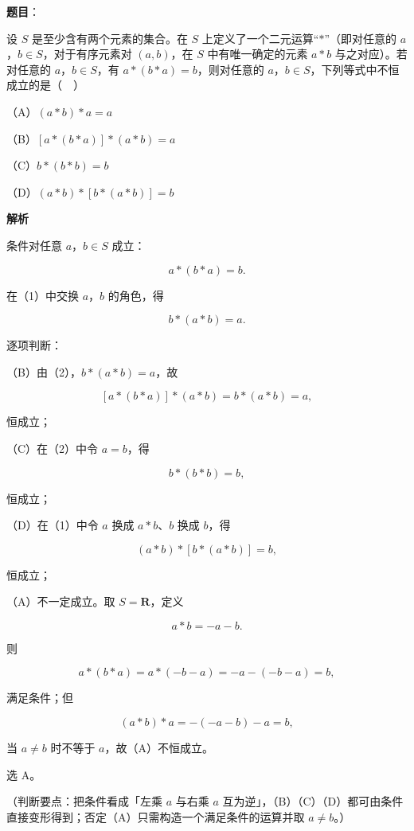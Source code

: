 \begin{answer}

\textbf{题目}：

设 $S$ 是至少含有两个元素的集合。在 $S$ 上定义了一个二元运算“$*$”（即对任意的 $a$，$b\in S$，对于有序元素对 $(a,b)$，在 $S$ 中有唯一确定的元素 $a*b$ 与之对应）。若对任意的 $a$，$b\in S$，有 $a*(b*a)=b$，则对任意的 $a$，$b\in S$，下列等式中不恒成立的是（　）

（A）$(a*b)*a=a$

（B）$[a*(b*a)]*(a*b)=a$

（C）$b*(b*b)=b$

（D）$(a*b)*[b*(a*b)]=b$

\textbf{解析}

条件对任意 $a$，$b\in S$ 成立：

\nopagebreak[4]
\[a*(b*a)=b.\tag{1}\]

在（1）中交换 $a$，$b$ 的角色，得

\nopagebreak[4]
\[b*(a*b)=a.\tag{2}\]

逐项判断：

（B）由（2），$b*(a*b)=a$，故

\nopagebreak[4]
\[[a*(b*a)]*(a*b)=b*(a*b)=a,\]

恒成立；

（C）在（2）中令 $a=b$，得

\nopagebreak[4]
\[b*(b*b)=b,\]

恒成立；

（D）在（1）中令 $a$ 换成 $a*b$、$b$ 换成 $b$，得

\nopagebreak[4]
\[(a*b)*[b*(a*b)]=b,\]

恒成立；

（A）不一定成立。取 $S=\mathbf R$，定义

\nopagebreak[4]
\[a*b=-a-b.\]

则

\nopagebreak[4]
\[a*(b*a)=a*(-b-a)=-a-(-b-a)=b,\]

满足条件；但

\nopagebreak[4]
\[(a*b)*a=-(-a-b)-a=b,\]

当 $a\neq b$ 时不等于 $a$，故（A）不恒成立。

选 A。

（判断要点：把条件看成「左乘 $a$ 与右乘 $a$ 互为逆」，（B）（C）（D）都可由条件直接变形得到；否定（A）只需构造一个满足条件的运算并取 $a\neq b$。）


\end{answer}
